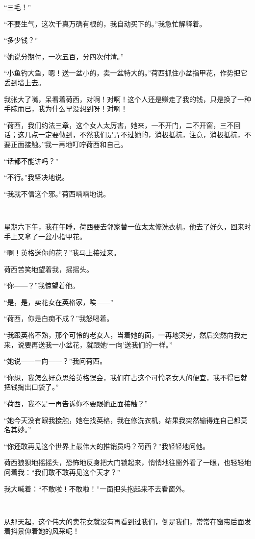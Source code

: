 \par “三毛！”
\par “不要生气，这次千真万确有根的，我自动买下的。”我急忙解释着。
\par “多少钱？”
\par “她说分期付，一次五百，分四次付清。”
\par “小鱼钓大鱼，嗯！送一盆小的，卖一盆特大的。”荷西抓住小盆指甲花，作势把它丢到墙上去。
\par 我张大了嘴，呆看着荷西，对啊！对啊！这个人还是赚走了我的钱，只是换了一种手腕而已，我为什么早没想到呀！对啊！
\par “荷西，我们约法三章，这个女人太厉害，她来，一不开门，二不开窗，三不回话；这几点一定要做到，不然我们是弄不过她的，消极抵抗，注意，消极抵抗，不要正面接触。”我一再地叮咛荷西和自己。
\par “话都不能讲吗？”
\par “不行。”我坚决地说。
\par “我就不信这个邪。”荷西喃喃地说。
\par  
\par 星期六下午，我在午睡，荷西要去邻家替一位太太修洗衣机，他去了好久，回来时手上又拿了一盆小指甲花。
\par “啊！英格送你的花？”我马上接过来。
\par 荷西苦笑地望着我，摇摇头。
\par “你——？”我惊望着他。
\par “是，是，卖花女在英格家，唉——”
\par “荷西，你是白痴不成？”我怒喝着。
\par “我跟英格不熟，那个可怜的老女人，当着她的面，一再地哭穷，然后突然向我走来，说要再送我一小盆花，就跟她‘一向’送我们的一样。”
\par “她说——一向——？”我问荷西。
\par “你想，我怎么好意思给英格误会，我们在占这个可怜老女人的便宜，我不得已就把钱掏出口袋了。”
\par “荷西，我不是一再告诉你不要跟她正面接触？”
\par “她今天没有跟我接触，她在找英格，我在修洗衣机，结果我突然输得连自己都莫名其妙。”
\par “你还敢再见这个世界上最伟大的推销员吗？荷西？”我轻轻地问他。
\par 荷西狼狈地摇摇头，恐怖地反身把大门锁起来，悄悄地往窗外看了一眼，也轻轻地问着我：“我们敢不敢再见这个天才？”
\par 我大喊着：“不敢啦！不敢啦！”一面把头抱起来不去看窗外。
\par  
\par 从那天起，这个伟大的卖花女就没有再看到过我们，倒是我们，常常在窗帘后面发着抖景仰着她的风采呢！



